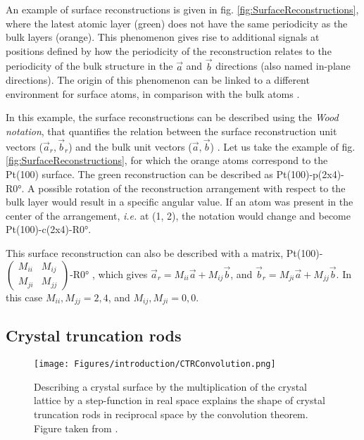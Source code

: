 An example of surface reconstructions is given in fig. \ref{fig:SurfaceReconstructions}, where the latest atomic layer (green) does not have the same periodicity as the bulk layers (orange).
This phenomenon gives rise to additional signals at positions defined by how the periodicity of the reconstruction relates to the periodicity of the bulk structure in the $\vec{a}$ and $\vec{b}$ directions (also named in-plane directions).
The origin of this phenomenon can be linked to a different environment for surface atoms, in comparison with the bulk atoms \parencite{Robinson1983, Feidenhansl1989}.

In this example, the surface reconstructions can be described using the \textit{Wood notation}, that quantifies the relation between the surface reconstruction unit vectors ($\vec{a}_r, \vec{b}_r$) and the bulk unit vectors ($\vec{a}, \vec{b}$) \parencite{Wood1964, Unertl1996, Goncharova2018}.
Let us take the example of fig. \ref{fig:SurfaceReconstructions}, for which the orange atoms correspond to the Pt(100) surface.
The green reconstruction can be described as Pt(100)-p(2x4)-R\ang{0}.
A possible rotation of the reconstruction arrangement with respect to the bulk layer would result in a specific angular value.
If an atom was present in the center of the  arrangement, \textit{i.e.} at (1, 2), the notation would change and become Pt(100)-c(2x4)-R\ang{0}.

This surface reconstruction can also be described with a matrix, Pt(100)-
$\begin{pmatrix}
  M_{ii} & M_{ij}\\
  M_{ji} & M_{jj}
\end{pmatrix}$-R\ang{0}
, which gives $\vec{a}_r = M_{ii} \vec{a} + M_{ij} \vec{b}$, and  $\vec{b}_r = M_{ji} \vec{a} + M_{jj} \vec{b}$.
In this case $M_{ii}, M_{jj} = 2, 4$, and $M_{ij}, M_{ji} = 0, 0$.

\subsection{Crystal truncation rods} \label{sec:CTR}

\begin{figure}[!htb]
    \centering
    \texttt{[image: Figures/introduction/CTRConvolution.png]}
    \caption{
    Describing a crystal surface by the multiplication of the crystal lattice by a step-function in real space explains the shape of crystal truncation rods in reciprocal space by the convolution theorem.
    Figure taken from \cite{Willmott}.
    }
    \label{fig:CTRConvolution}
\end{figure}

